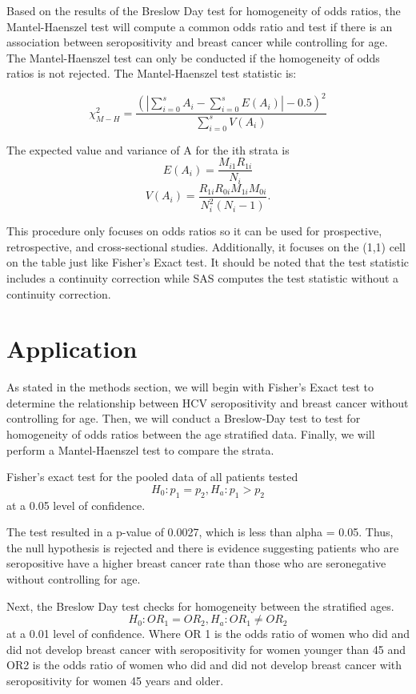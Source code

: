 \documentclass[12pt, titlepage]{article}
\begin{document}
Based on the results of the Breslow Day test for homogeneity of odds ratios,
the Mantel-Haenszel test will compute a common odds ratio and test if there 
is an association between seropositivity and breast cancer while controlling 
for age. The Mantel-Haenszel test can only be conducted if the homogeneity of 
odds ratios is not rejected. The Mantel-Haenszel test statistic is:
\vspace{0.5cm}

\begin{equation}
  \chi_{M-H}^2=\frac{(|\sum\limits_{i=0}^s A_i - \sum\limits_{i=0}^sE(A_i)|-0.5)^2}
{\sum\limits_{i=0}^s V(A_i)}
\end{equation}

\vspace{0.5cm}

The expected value and variance of A for the ith strata is 
\[
  E(A_{i})=\frac{M_{i1}R_{1i}}{N_{i}} 
\]
\[
  V(A_{i})=\frac{R_{1i}R_{0i}M_{1i}M_{0i}}{N_i^2(N_{i}-1)}. 
\]


This procedure only focuses on odds ratios so it can be used for prospective, 
retrospective, and cross-sectional studies. Additionally, it focuses on the (1,1) 
cell on the table just like Fisher's Exact test. It should be noted that the test 
statistic includes a continuity correction while SAS computes the test statistic 
without a continuity correction. 


\section{Application}
\label{sec:app}
As stated in the methods section, we will begin with Fisher's Exact test to 
determine the relationship between HCV seropositivity and breast cancer without 
controlling for age. Then, we will conduct a Breslow-Day test to test for 
homogeneity of odds ratios between the age stratified data. Finally, we will 
perform a Mantel-Haenszel test to compare the strata. 

Fisher's exact test for the pooled data of all patients tested 
\[
H_{0}:p_{1}=p_{2}, H_{a}:p_{1}>p_{2}
\]
at a 0.05 level of confidence.

The test resulted in a p-value of 0.0027, which is less than 
alpha = 0.05. Thus, the null hypothesis is rejected and there 
is evidence suggesting patients who are seropositive have a
higher breast cancer rate than those who are seronegative 
without controlling for age. 

Next, the Breslow Day test checks for homogeneity between the 
stratified ages. 
\[
H_{0}:OR_{1}=OR_{2}, H_{a}:OR_{1}\neq{OR_{2}}
\]
at a 0.01 level of confidence. Where OR 1 is the odds ratio of 
women who did and did not develop breast cancer with seropositivity 
for women younger than 45 and OR2 is the odds ratio of women who 
did and did not develop breast cancer with seropositivity for women 
45 years and older. 
\end{document}
